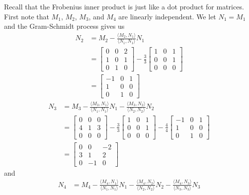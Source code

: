 \begin{example}
\ExampleSolution Recall that the Frobenius inner product is just like a dot product for matrices. First note that $M_1$, $M_2$, $M_3$, and $M_4$ are linearly independent. We let $N_1 = M_1$ and the Gram-Schmidt process gives us 
\begin{align*}
N_2 &= M_2 - \frac{\langle M_2,N_1 \rangle}{\langle N_1,  N_1\rangle} N_1 \\
	&=\left[  \begin{array}{ccc} 0&0&2\\1&0&1\\0&1&0 \end{array} \right] - \frac{3}{3}\left[ \begin{array}{ccc} 1&0&1\\0&0&1\\0&0&0 \end{array} \right] \\
	&= \left[ \begin{array}{rcc} -1&0&1\\1&0&0\\0&1&0 \end{array} \right]
\end{align*}
\begin{align*}
N_3 &= M_3 - \frac{\langle M_3,N_1 \rangle}{\langle N_1,  N_1\rangle} N_1 - \frac{\langle M_3,N_2 \rangle}{\langle N_2,  N_2\rangle} N_2 \\
	&= \left[ \begin{array}{ccc} 0&0&0\\4&1&3\\0&0&0 \end{array} \right] - \frac{3}{3}\left[ \begin{array}{ccc} 1&0&1\\0&0&1\\0&0&0 \end{array} \right] - \frac{4}{4}\left[ \begin{array}{rcc} -1&0&1\\1&0&0\\0&1&0 \end{array} \right]  \\
	&= \left[ \begin{array}{crr} 0&0&-2\\3&1&2\\0&-1&0 \end{array} \right]
\end{align*}
and
\begin{align*}
N_4 &= M_4 - \frac{\langle M_4,N_1 \rangle}{\langle N_1,  N_1\rangle} N_1 - \frac{\langle M_4,N_2 \rangle}{\langle N_2,  N_2\rangle} N_2 - \frac{\langle M_4,N_3 \rangle}{\langle N_3,  N_3\rangle} N_3 \\

\end{align*}
\end{example}
